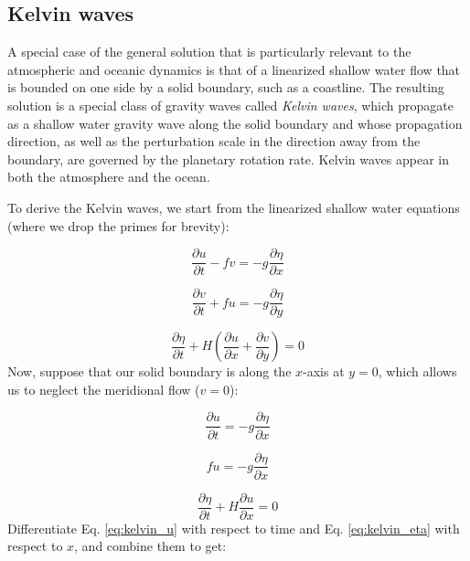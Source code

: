 \documentclass[12pt]{article}
\numberwithin{equation}{section}
\numberwithin{figure}{section}
\numberwithin{table}{section}
\begin{document}
\subsection{Kelvin waves}

A special case of the general solution that is particularly relevant to the
atmospheric and oceanic dynamics is that of a linearized shallow water flow
that is bounded on one side by a solid boundary, such as a coastline.
The resulting solution is a special class of gravity waves called
\textit{Kelvin waves}, which propagate as a shallow water
gravity wave along the solid boundary and whose propagation direction, as well
as the perturbation scale in the direction away from the boundary, are governed
by the planetary rotation rate.
Kelvin waves appear in both the atmosphere and the ocean.

To derive the Kelvin waves, we start from the linearized shallow water equations
(where we drop the primes for brevity):

\begin{equation}
  \frac{\partial u}{\partial t} - f v = - g \frac{\partial \eta}{\partial x}
\end{equation}

\begin{equation}
  \frac{\partial v}{\partial t} + f u = - g \frac{\partial \eta}{\partial y}
\end{equation}

\begin{equation}
  \frac{\partial \eta}{\partial t} + H \left( \frac{\partial u}{\partial x} + \frac{\partial v}{\partial y} \right) = 0
\end{equation}
Now, suppose that our solid boundary is along the $x$-axis at $y = 0$, which
allows us to neglect the meridional flow ($v=0$):

\begin{equation}
  \frac{\partial u}{\partial t} = - g \frac{\partial \eta}{\partial x}
  \label{eq:kelvin_u}
\end{equation}

\begin{equation}
  f u = - g \frac{\partial \eta}{\partial x}
  \label{eq:kelvin_v}
\end{equation}

\begin{equation}
  \frac{\partial \eta}{\partial t} + H \frac{\partial u}{\partial x} = 0
  \label{eq:kelvin_eta}
\end{equation}
Differentiate Eq. \ref{eq:kelvin_u} with respect to time and Eq. \ref{eq:kelvin_eta}
with respect to $x$, and combine them to get:
\end{document}
